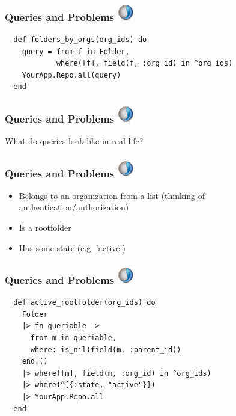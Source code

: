 \documentclass{beamer}
\begin{document}

\begin{frame}[fragile]
\frametitle{Queries and Problems \hfill \includegraphics[width=0.05\textwidth]{recogizer_logo_small.png}}
\begin{verbatim}
  def folders_by_orgs(org_ids) do
    query = from f in Folder,
            where([f], field(f, :org_id) in ^org_ids)
    YourApp.Repo.all(query)
  end
\end{verbatim}
\end{frame}


\begin{frame}[fragile]
\frametitle{Queries and Problems \hfill \includegraphics[width=0.05\textwidth]{recogizer_logo_small.png}}
\centerline{What do queries look like in real life?}
\end{frame}


\begin{frame}[fragile]
\frametitle{Queries and Problems \hfill \includegraphics[width=0.05\textwidth]{recogizer_logo_small.png}}
\begin{itemize}
\item Belongs to an organization from a list (thinking of authentication/authorization)
\item Is a rootfolder
\item Has some state (e.g. 'active')
\end{itemize}
\end{frame}


\begin{frame}[fragile]
\frametitle{Queries and Problems \hfill \includegraphics[width=0.05\textwidth]{recogizer_logo_small.png}}
\begin{verbatim}
  def active_rootfolder(org_ids) do
    Folder
    |> fn queriable ->
      from m in queriable,
      where: is_nil(field(m, :parent_id))
    end.()
    |> where([m], field(m, :org_id) in ^org_ids)
    |> where(^[{:state, "active"}])
    |> YourApp.Repo.all
  end
\end{verbatim}
\end{frame}
\end{document}
